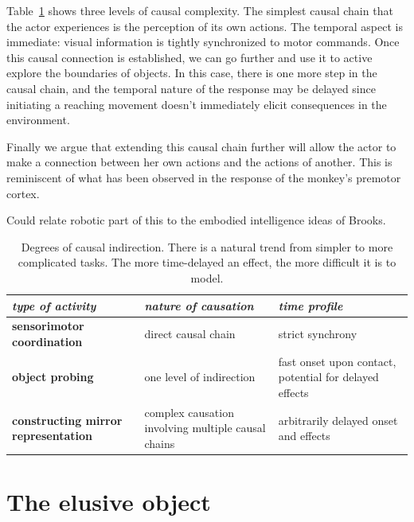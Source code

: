 Table~\ref{tab:causation} shows three levels of causal complexity.
The simplest causal chain that the actor experiences is the
perception of its own actions.  The temporal aspect is immediate:
visual information is tightly synchronized to motor commands.
Once this causal connection is established, we can go further and use
it to active explore the boundaries of objects.  In this case, there
is one more step in the causal chain, and the temporal nature of
the response may be delayed since initiating a reaching movement doesn't
immediately elicit consequences in the environment.  


Finally we argue that extending this causal chain further will allow
the actor to make a connection between her own actions and the actions 
of another. This is reminiscent of what has been observed in the response
of the monkey's premotor cortex. 

Could relate robotic part of this to the embodied intelligence ideas
of Brooks.

\begin{table}[htbp]
\begin{center}
\begin{tabular}{|p{5.2cm}|p{4.5cm}|p{4.5cm}|}
\hline
{\it type of activity} & {\it nature of causation} &  {\it time profile} \\ \hline\hline
{\bf sensorimotor coordination} & direct causal chain & strict synchrony \\ \hline
{\bf object probing} & one level of indirection & fast onset upon contact, potential for delayed effects\\ \hline
{\bf constructing mirror representation} &  complex causation involving multiple causal chains & arbitrarily delayed onset and effects\\ \hline
\end{tabular}
\caption{
\label{tab:causation}
%
Degrees of causal indirection. There is a natural
trend from simpler to more complicated tasks.  The more time-delayed
an effect, the more difficult it is to model.
%
}
\end{center}
\end{table}



\ifverbose 

\section{The elusive object}

